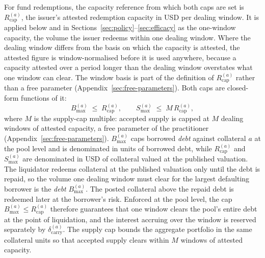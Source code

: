 For fund redemptions, the capacity reference from which both caps are set is $R_{\mathrm{cap}}^{(a)}$, the issuer's attested redemption capacity in USD per dealing window. It is applied below and in Sections~\ref{sec:policy}--\ref{sec:efficacy} as the one-window capacity, the volume the issuer redeems within one dealing window. Where the dealing window differs from the basis on which the capacity is attested, the attested figure is window-normalised before it is used anywhere, because a capacity attested over a period longer than the dealing window overstates what one window can clear. The window basis is part of the definition of $R_{\mathrm{cap}}^{(a)}$ rather than a free parameter (Appendix~\ref{sec:free-parameters}). Both caps are closed-form functions of it:
\begin{equation}\label{eq:theory-caps}
B_{\max}^{(a)} \;\le\; R_{\mathrm{cap}}^{(a)},
\qquad
S_{\max}^{(a)} \;\le\; M\, R_{\mathrm{cap}}^{(a)},
\end{equation}
where $M$ is the supply-cap multiple: accepted supply is capped at $M$ dealing windows of attested capacity, a free parameter of the practitioner (Appendix~\ref{sec:free-parameters}). $B_{\max}^{(a)}$ caps borrowed \emph{debt} against collateral $a$ at the pool level and is denominated in units of borrowed debt, while $R_{\mathrm{cap}}^{(a)}$ and $S_{\max}^{(a)}$ are denominated in USD of collateral valued at the published valuation. The liquidator redeems collateral at the published valuation only until the debt is repaid, so the volume one dealing window must clear for the largest defaulting borrower is the \emph{debt} $B_{\max}^{(a)}$. The posted collateral above the repaid debt is redeemed later at the borrower's risk. Enforced at the pool level, the cap $B_{\max}^{(a)}\le R_{\mathrm{cap}}^{(a)}$ therefore guarantees that one window clears the pool's entire debt at the point of liquidation, and the interest accruing over the window is reserved separately by $\delta_{\mathrm{carry}}^{(a)}$. The supply cap bounds the aggregate portfolio in the same collateral units so that accepted supply clears within $M$ windows of attested capacity.

